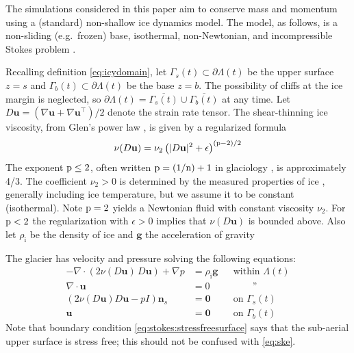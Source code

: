 \documentclass[hidelinks,onefignum,onetabnum,final]{siamart220329}  %
\newcommand{\eps}{\epsilon}
\newcommand{\grad}{\nabla}
\newcommand{\bg}{\mathbf{g}}
\newcommand{\bn}{\mathbf{n}}
\newcommand{\bu}{\mathbf{u}}
\newcommand{\bzero}{\bm{0}}
\newcommand{\nn}{{\text{\textnormal{n}}}}
\newcommand{\pp}{{\text{\textnormal{p}}}}
\newcommand{\rhoi}{\rho_{\text{i}}}
\begin{document}
The simulations considered in this paper aim to conserve mass and momentum using a (standard) non-shallow ice dynamics model.  The model, as follows, is a non-sliding (e.g.~frozen) base, isothermal, non-Newtonian, and incompressible Stokes problem \cite{GreveBlatter2009,JouvetRappaz2011,SchoofHewitt2013}.

Recalling definition \eqref{eq:icydomain}, let $\Gamma_s(t) \subset \partial \Lambda(t)$ be the upper surface $z=s$ and $\Gamma_b(t) \subset \partial \Lambda(t)$ be the base $z=b$.  The possibility of cliffs at the ice margin is neglected, so $\partial \Lambda(t) = \overline{\Gamma_s(t)} \cup \overline{\Gamma_b(t)}$ at any time.  Let $D\bu=(\grad \bu + \grad \bu^{\top})/2$ denote the strain rate tensor.  The shear-thinning ice viscosity, from Glen's power law \cite{GreveBlatter2009}, is given by a regularized formula
\begin{equation}
\nu(D\bu) = \nu_2 \left(|D\bu|^2 + \eps\right)^{(\pp-2)/2} \label{eq:glen}
\end{equation}
The exponent $\pp \le 2$, often written $\pp=(1/\nn)+1$ in glaciology \cite{GoldsbyKohlstedt2001}, is approximately 4/3.  The coefficient $\nu_2>0$ is determined by the measured properties of ice \cite{GoldsbyKohlstedt2001,GreveBlatter2009}, generally including ice temperature, but we assume it to be constant (isothermal).  Note $\pp=2$ yields a Newtonian fluid with constant viscosity $\nu_2$.  For $\pp < 2$ the regularization with $\eps>0$ implies that $\nu(D\bu)$ is bounded above.  Also let $\rhoi$ be the density of ice and $\bg$ the acceleration of gravity

The glacier has velocity and pressure solving the following equations:
\begin{subequations}
\label{eq:stokes}
\begin{align}
- \nabla \cdot \left(2 \nu(D\bu)\, D\bu\right) + \nabla p &= \rhoi \bg && \text{within $\Lambda(t)$} \\
\nabla \cdot \bu &= 0 && \qquad \text{''} \label{eq:stokes:incomp} \\
\left(2 \nu(D\bu) D\bu - pI\right) \bn_s &= \bzero && \text{on $\Gamma_s(t)$}\label{eq:stokes:stressfreesurface} \\
\bu  &= \bzero && \text{on $\Gamma_b(t)$}
\end{align}
\end{subequations}
Note that boundary condition \eqref{eq:stokes:stressfreesurface} says that the sub-aerial upper surface is stress free; this should not be confused with \eqref{eq:ske}.
\end{document}
